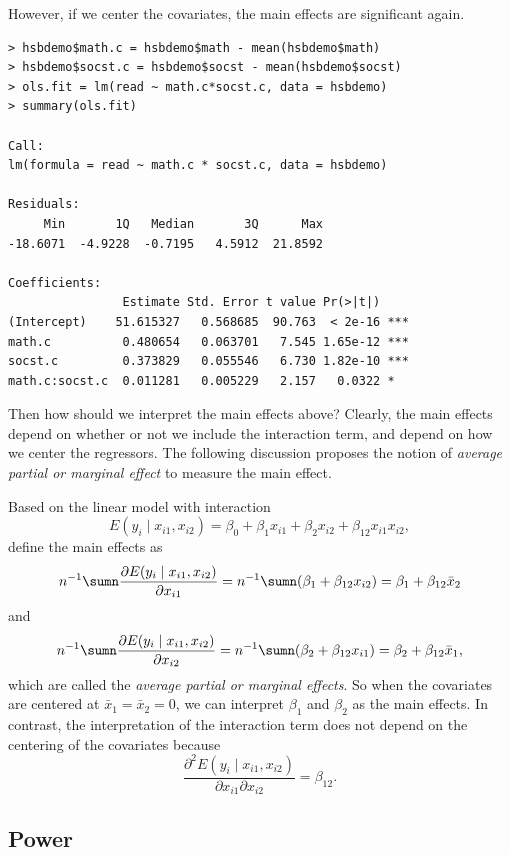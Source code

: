 However, if we center the covariates, the main effects are significant again. 
\begin{lstlisting}
> hsbdemo$math.c = hsbdemo$math - mean(hsbdemo$math)
> hsbdemo$socst.c = hsbdemo$socst - mean(hsbdemo$socst)
> ols.fit = lm(read ~ math.c*socst.c, data = hsbdemo)
> summary(ols.fit)

Call:
lm(formula = read ~ math.c * socst.c, data = hsbdemo)

Residuals:
     Min       1Q   Median       3Q      Max 
-18.6071  -4.9228  -0.7195   4.5912  21.8592 

Coefficients:
                Estimate Std. Error t value Pr(>|t|)    
(Intercept)    51.615327   0.568685  90.763  < 2e-16 ***
math.c          0.480654   0.063701   7.545 1.65e-12 ***
socst.c         0.373829   0.055546   6.730 1.82e-10 ***
math.c:socst.c  0.011281   0.005229   2.157   0.0322 *  
\end{lstlisting}

Then how should we interpret the main effects above? Clearly, the main effects depend on whether or not we include the interaction term, and depend on how we center the regressors. The following discussion proposes the notion of {\it average partial or marginal effect} to measure the main effect. 



Based on the linear model with interaction
$$
E(y_i\mid x_{i1}, x_{i2}) = \beta_0 + \beta_1 x_{i1} + \beta_2 x_{i2} + \beta_{12} x_{i1} x_{i2},
$$
define the main effects as
$$
n^{-1} \sumn \frac{  \partial E(y_i\mid x_{i1}, x_{i2}) }{ \partial x_{i1} } = n^{-1} \sumn ( \beta_1 +  \beta_{12}   x_{i2}  )
= \beta_1 +  \beta_{12} \bar{x}_2
$$
and
$$
n^{-1} \sumn \frac{  \partial E(y_i\mid x_{i1}, x_{i2}) }{ \partial x_{i2} } = n^{-1} \sumn ( \beta_2 +  \beta_{12}   x_{i1}  )
= \beta_2 +  \beta_{12} \bar{x}_1 ,
$$
which are called the {\it average partial or marginal effects}. 
So when the covariates are centered at $\bar{x}_1 = \bar{x}_2 = 0$, we can interpret $\beta_1$ and $\beta_2$ as the main effects. 
In contrast, the interpretation of the interaction term does not depend on the centering of the covariates because
$$
\frac{  \partial^2 E(y_i\mid x_{i1}, x_{i2}) }{ \partial x_{i1} \partial x_{i2}}  = \beta_{12}.
$$




\subsection{Power}


